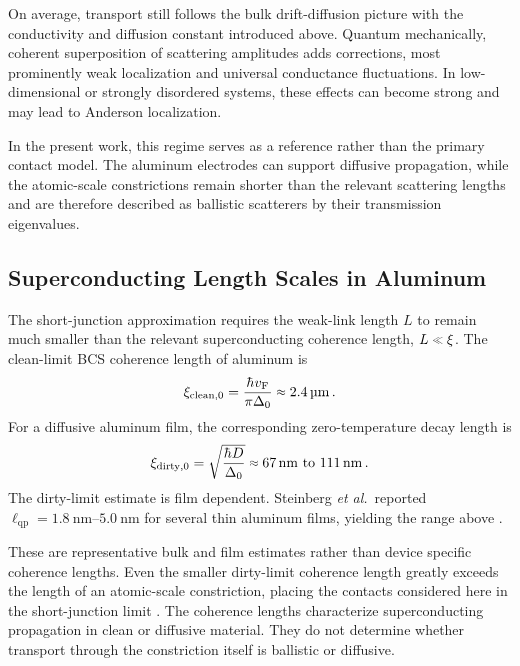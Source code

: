         On average, transport still follows the bulk drift-diffusion picture with the conductivity and diffusion constant introduced above. Quantum mechanically, coherent superposition of scattering amplitudes adds corrections, most prominently weak localization and universal conductance fluctuations. In low-dimensional or strongly disordered systems, these effects can become strong and may lead to Anderson localization. \cite{bergmann_weak_1984,lee_universal_1985,lee_disordered_1985,anderson_absence_1958,schertel_magnetic-field_2019}

        In the present work, this regime serves as a reference rather than the primary contact model. The aluminum electrodes can support diffusive propagation, while the atomic-scale constrictions remain shorter than the relevant scattering lengths and are therefore described as ballistic scatterers by their transmission eigenvalues.

    \subsection*{Superconducting Length Scales in Aluminum}

        The short-junction approximation requires the weak-link length $L$ to remain much smaller than the relevant superconducting coherence length, $L\sll\xi$. The clean-limit BCS coherence length of aluminum is
        \begin{equation}
            \xi_{\mathrm{clean}, 0} = \frac{\hbar v_\mathrm{F}}{\pi\Delta_0}\sapprox \qty{2.4}{\micro\meter}\,.
        \end{equation}
        For a diffusive aluminum film, the corresponding zero-temperature decay length is
        \begin{equation}
            \xi_{\mathrm{dirty},0}
            = \sqrt{\frac{\hbar D}{\Delta_0}}\sapprox \qtyrange{67}{111}{\nano\meter}\,.
        \end{equation}
        The dirty-limit estimate is film dependent. Steinberg \textit{et al.}~reported \(\ell_\mathrm{qp}=\qtyrange{1.8}{5.0}{\nano\meter}\) for several thin aluminum films, yielding the range above \cite{steinberg_quasi-particle_2008}.

        These are representative bulk and film estimates rather than device specific coherence lengths. Even the smaller dirty-limit coherence length greatly exceeds the length of an atomic-scale constriction, placing the contacts considered here in the short-junction limit \cite{scheer_conduction_1997}. The coherence lengths characterize superconducting propagation in clean or diffusive material. They do not determine whether transport through the constriction itself is ballistic or diffusive.

